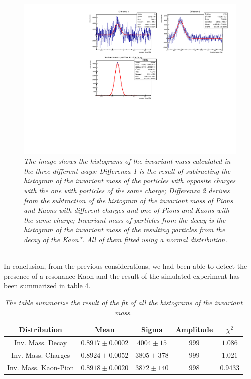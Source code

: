 \documentclass[a4paper, 11pt]{article}
\begin{document}
    \begin{figure}[h!]
      \includegraphics[width=.8\linewidth]{cam.pdf}
      \caption{\label{f3}\textit{The image shows the histograms of the invariant mass calculated in the three different ways: Differenza 1 is the result of subtracting the histogram of the invariant mass of the particles with opposite charges with the one with particles of the same charge; Differenza 2 derives from the subtraction of the histogram of the invariant mass of Pions and Kaons with different charges and one of Pions and Kaons with the same charge; Invariant mass of particles from the decay is the histogram of the invariant mass of the resulting particles from the decay of the Kaon*. All of them fitted using a normal distribution.}}
    \end{figure}
    \\
    In conclusion, from the previous considerations, we had been able to detect the presence of a resonance Kaon and the result of the simulated experiment has been summarized in table 4.
    \begin{table}[h!]
      \centering
      \begin{tabular}{ c | c c c c }
        \hline
        Distribution & Mean & Sigma & Amplitude & $\chi^2$ \\
        \hline
        Inv. Mass. Decay & $0.8917\pm0.0002$ & $4004\pm15$ & $999$ & $1.086$\\
        Inv. Mass. Charges & $0.8924\pm0.0052$ & $3805\pm378$ & $999$ & $1.021$\\
        Inv. Mass. Kaon-Pion & $0.8918\pm0.0020$ & $3872\pm140$ & $998$ & $0.9433$ \\
        \hline
      \end{tabular}
      \caption{ \label{Table 4}
      \textit{The table summarize the result of the fit of all the histograms of the invariant mass.}
      }
    \end{table}
\end{document}
